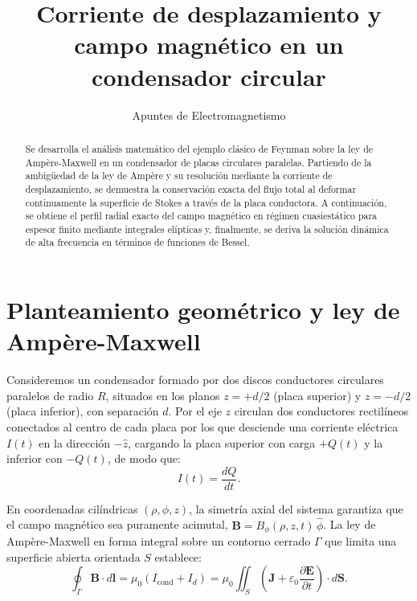 \documentclass[11pt]{article}
\title{\textbf{\color{accentblue}Corriente de desplazamiento y campo magnético en un condensador circular}}
\author{Apuntes de Electromagnetismo}
\date{}
\begin{document}
\maketitle

\begin{abstract}
Se desarrolla el análisis matemático del ejemplo clásico de Feynman sobre la ley de Ampère-Maxwell en un condensador de placas circulares paralelas. Partiendo de la ambigüedad de la ley de Ampère y su resolución mediante la corriente de desplazamiento, se demuestra la conservación exacta del flujo total al deformar continuamente la superficie de Stokes a través de la placa conductora. A continuación, se obtiene el perfil radial exacto del campo magnético en régimen cuasiestático para espesor finito mediante integrales elípticas y, finalmente, se deriva la solución dinámica de alta frecuencia en términos de funciones de Bessel.
\end{abstract}

\tableofcontents
\vspace{0.5cm}

\section{Planteamiento geométrico y ley de Ampère-Maxwell}

Consideremos un condensador formado por dos discos conductores circulares paralelos de radio $R$, situados en los planos $z = +d/2$ (placa superior) y $z = -d/2$ (placa inferior), con separación $d$. Por el eje $z$ circulan dos conductores rectilíneos conectados al centro de cada placa por los que desciende una corriente eléctrica $I(t)$ en la dirección $-\hat{z}$, cargando la placa superior con carga $+Q(t)$ y la inferior con $-Q(t)$, de modo que:
\begin{equation}
    I(t) = \frac{dQ}{dt}.
\end{equation}

En coordenadas cilíndricas $(\rho, \phi, z)$, la simetría axial del sistema garantiza que el campo magnético sea puramente acimutal, $\mathbf{B} = B_\phi(\rho, z, t)\,\hat{\phi}$. La ley de Ampère-Maxwell en forma integral sobre un contorno cerrado $\Gamma$ que limita una superficie abierta orientada $S$ establece:
\begin{equation}
    \oint_{\Gamma} \mathbf{B} \cdot d\mathbf{l} = \mu_0 \left( I_{\mathrm{cond}} + I_d \right) = \mu_0 \iint_{S} \left( \mathbf{J} + \varepsilon_0 \frac{\partial \mathbf{E}}{\partial t} \right) \cdot d\mathbf{S}.
    \label{eq:ampere-maxwell}
\end{equation}
\end{document}

